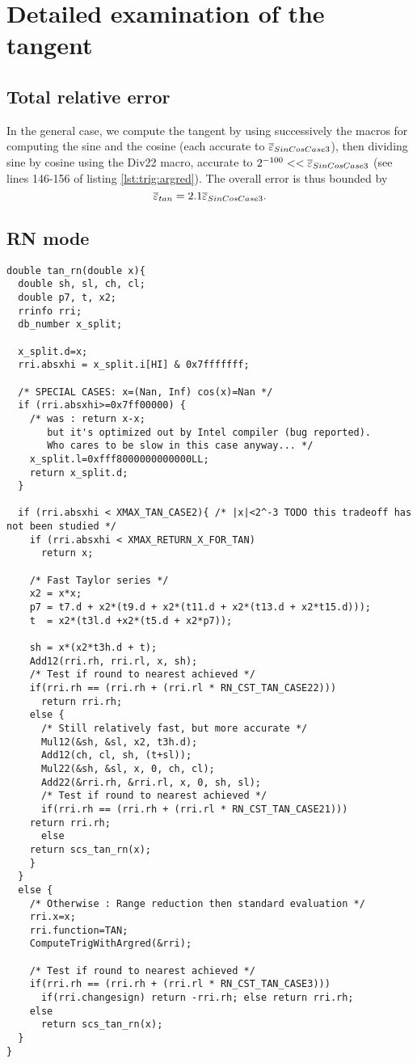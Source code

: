 \section{Detailed examination of the tangent}

\subsection{Total relative error}
In the general case, we compute the tangent by using successively the
macros for computing the sine and the cosine (each accurate to
${\overline{\varepsilon}}_{SinCosCase3}$), then dividing sine by cosine using the Div22
macro, accurate to $2^{-100}<<{\overline{\varepsilon}}_{SinCosCase3}$ (see lines 146-156
of listing \ref{lst:trig:argred}). The overall error is thus bounded
by $${\overline{\varepsilon}}_{tan} = 2.1{\overline{\varepsilon}}_{SinCosCase3} .$$


\subsection{RN mode}
\begin{lstlisting}[caption={Exceptional cases for tangent RN},firstnumber=1]
double tan_rn(double x){  
  double sh, sl, ch, cl;
  double p7, t, x2;
  rrinfo rri;
  db_number x_split;

  x_split.d=x;
  rri.absxhi = x_split.i[HI] & 0x7fffffff;

  /* SPECIAL CASES: x=(Nan, Inf) cos(x)=Nan */
  if (rri.absxhi>=0x7ff00000) {
    /* was : return x-x; 
       but it's optimized out by Intel compiler (bug reported).
       Who cares to be slow in this case anyway... */
    x_split.l=0xfff8000000000000LL;
    return x_split.d;
  }   

  if (rri.absxhi < XMAX_TAN_CASE2){ /* |x|<2^-3 TODO this tradeoff has not been studied */
    if (rri.absxhi < XMAX_RETURN_X_FOR_TAN) 
      return x;

    /* Fast Taylor series */
    x2 = x*x;
    p7 = t7.d + x2*(t9.d + x2*(t11.d + x2*(t13.d + x2*t15.d)));
    t  = x2*(t3l.d +x2*(t5.d + x2*p7));

    sh = x*(x2*t3h.d + t);
    Add12(rri.rh, rri.rl, x, sh);   
    /* Test if round to nearest achieved */ 
    if(rri.rh == (rri.rh + (rri.rl * RN_CST_TAN_CASE22)))
      return rri.rh;
    else {
      /* Still relatively fast, but more accurate */
      Mul12(&sh, &sl, x2, t3h.d);
      Add12(ch, cl, sh, (t+sl));
      Mul22(&sh, &sl, x, 0, ch, cl);
      Add22(&rri.rh, &rri.rl, x, 0, sh, sl);
      /* Test if round to nearest achieved */ 
      if(rri.rh == (rri.rh + (rri.rl * RN_CST_TAN_CASE21)))
	return rri.rh;
      else
	return scs_tan_rn(x); 
    }
  }
  else {
    /* Otherwise : Range reduction then standard evaluation */
    rri.x=x;
    rri.function=TAN;
    ComputeTrigWithArgred(&rri);

    /* Test if round to nearest achieved */ 
    if(rri.rh == (rri.rh + (rri.rl * RN_CST_TAN_CASE3)))
      if(rri.changesign) return -rri.rh; else return rri.rh;
    else
      return scs_tan_rn(x); 
  }    
}
\end{lstlisting}

